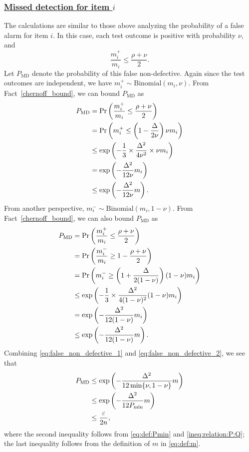 \documentclass[onecolumn,letterpaper]{IEEEtran}
\newcommand{\nt}{{m}}
\newcommand{\nti}{{\nt_{i}}}
\newcommand{\ntip}{{\nt_{i}^+}}
\newcommand{\ntin}{{\nt_{i}^-}}
\newcommand{\fn}{{P_{\text{MD}}}}
\newcommand{\spn}{{\rho}}
\newcommand{\spp}{{\nu}}
\newcommand{\spmin}{{P_{\min}}}
\newcommand{\spgap}{{\Delta}}
\begin{document}
\subsubsection{\underline{Missed detection for item $i$}} The calculations are similar to those above analyzing the probability of a false alarm for item $i$. In this case, each test outcome is positive with probability $\spp$, and
\begin{equation}
    \frac{\ntip}{\nti} \le \frac{\spn+\spp}{2}.
\end{equation}
Let $\fn$ denote the probability of this false non-defective. Again since the test outcomes are independent, we have $\ntip \sim \text{Binomial}(\nti,\spp)$. From Fact~\ref{chernoff_bound}, we can bound $\fn$ as
\begin{align}
\label{eq:false_non_defective_1}
\fn &= \Pr \left( \frac{\ntip}{\nti} \le \frac{\spn+\spp}{2} \right) \notag\\
&= \Pr \left( \ntip \le \left( 1-\frac{\spgap}{2\spp} \right) \spp \nti \right) \notag\\ 
&\le \exp\left( - \frac{1}{3} \times \frac{\spgap^2}{4\spp^2} \times \spp \nti \right) \notag\\ 
&= \exp \left( -\frac{\spgap^2}{12\spp} \nti \right) \notag\\
&\le \exp \left( -\frac{\spgap^2}{12\spp} \nt \right).
\end{align}
From another perspective, $\ntin \sim \text{Binomial} (\nti,1-\spp)$. From Fact~\ref{chernoff_bound}, we can also bound $\fn$ as
\begin{align}
\label{eq:false_non_defective_2}
\fn &= \Pr \left( \frac{\ntip}{\nti} \le \frac{\spn+\spp}{2} \right) \notag\\
&= \Pr \left( \frac{\ntin}{\nti} \ge 1 - \frac{\spn+\spp}{2} \right) \notag\\ 
&= \Pr \left( \ntin \ge \left( 1 + \frac{\spgap}{2(1-\spp)} \right) (1 - \spp) \nti \right) \notag\\ 
&\le \exp\left( - \frac{1}{3} \times \frac{\spgap^2}{4(1-\spp)^2} (1 - \spp) \nti \right) \notag\\ 
&= \exp \left( - \frac{\spgap^2}{12(1-\spp)} \nti \right) \notag\\
&\le \exp \left( - \frac{\spgap^2}{12(1-\spp)} \nt \right).
\end{align}
Combining \eqref{eq:false_non_defective_1} and \eqref{eq:false_non_defective_2}, we see that
\begin{align} 
\label{eq:false_non_defective}
\fn &\leq \exp\left( -\frac{\spgap^2}{12 \min\{\spp,1-\spp\}} \nt \right) \notag\\
    &\leq \exp\left( - \frac{\spgap^2}{12\spmin} \nt \right) \notag\\
    &\leq \frac{\varepsilon}{2n},
\end{align}
where the second inequality follows from \eqref{eq:def:Pmin} and \eqref{ineq:relation:P:Q}; the last inequality follows from the definition of $\nt$ in \eqref{eq:def:m}.
\end{document}
